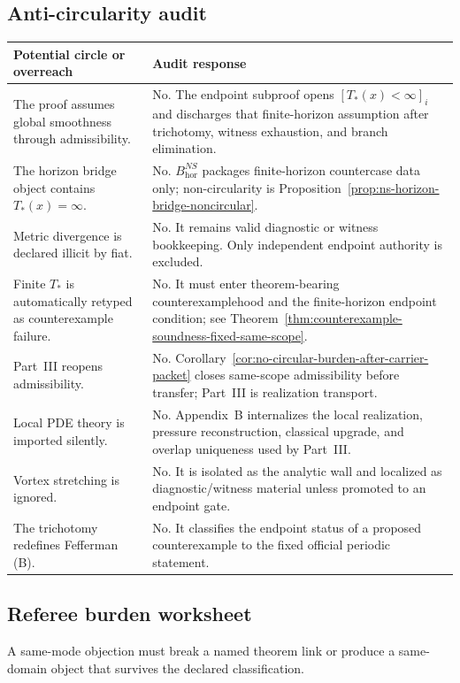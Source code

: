 \subsection{Anti-circularity audit}\label{sec:anti-circularity-audit-modernized}
\begin{center}
\footnotesize
\renewcommand{\arraystretch}{1.14}
\setlength{\tabcolsep}{4pt}
\begin{tabularx}{0.98\textwidth}{@{}L{0.34\textwidth}Y@{}}
\toprule
\textbf{Potential circle or overreach} & \textbf{Audit response}\\
\midrule
The proof assumes global smoothness through admissibility. & No. The endpoint subproof opens $[T_*(x)<\infty]_i$ and discharges that finite-horizon assumption after trichotomy, witness exhaustion, and branch elimination.\\
The horizon bridge object contains $T_*(x)=\infty$. & No. $B^{NS}_{\mathrm{hor}}$ packages finite-horizon countercase data only; non-circularity is Proposition~\ref{prop:ns-horizon-bridge-noncircular}.\\
Metric divergence is declared illicit by fiat. & No. It remains valid diagnostic or witness bookkeeping. Only independent endpoint authority is excluded.\\
Finite $T_*$ is automatically retyped as counterexample failure. & No. It must enter theorem-bearing counterexamplehood and the finite-horizon endpoint condition; see Theorem~\ref{thm:counterexample-soundness-fixed-same-scope}.\\
Part~III reopens admissibility. & No. Corollary~\ref{cor:no-circular-burden-after-carrier-packet} closes same-scope admissibility before transfer; Part~III is realization transport.\\
Local PDE theory is imported silently. & No. Appendix~B internalizes the local realization, pressure reconstruction, classical upgrade, and overlap uniqueness used by Part~III.\\
Vortex stretching is ignored. & No. It is isolated as the analytic wall and localized as diagnostic/witness material unless promoted to an endpoint gate.\\
The trichotomy redefines Fefferman (B). & No. It classifies the endpoint status of a proposed counterexample to the fixed official periodic statement.\\
\bottomrule
\end{tabularx}
\end{center}

\subsection{Referee burden worksheet}\label{sec:referee-burden-modernized}
A same-mode objection must break a named theorem link or produce a same-domain object that survives the declared classification.

